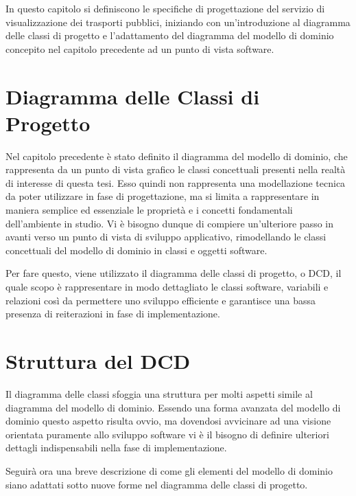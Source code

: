 In questo capitolo si definiscono le specifiche di progettazione del servizio di visualizzazione dei trasporti pubblici, iniziando con un'introduzione al diagramma delle classi di progetto e l'adattamento del diagramma del modello di dominio concepito nel capitolo precedente ad un punto di vista software.



\section{Diagramma delle Classi di Progetto} %
\label{sec:diagramma_delle_classi_di_progetto}

Nel capitolo precedente è stato definito il diagramma del modello di dominio, che rappresenta da un punto di vista grafico le classi concettuali presenti nella realtà di interesse di questa tesi. Esso quindi non rappresenta una modellazione tecnica da poter utilizzare in fase di progettazione, ma si limita a rappresentare in maniera semplice ed essenziale le proprietà e i concetti fondamentali dell'ambiente in studio.
Vi è bisogno dunque di compiere un'ulteriore passo in avanti verso un punto di vista di sviluppo applicativo, rimodellando le classi concettuali del modello di dominio in classi e oggetti software.

Per fare questo, viene utilizzato il diagramma delle classi di progetto, o DCD, il quale scopo è rappresentare in modo dettagliato le classi software, variabili e relazioni così da permettere uno sviluppo efficiente e garantisce una bassa presenza di reiterazioni in fase di implementazione.

\section{Struttura del DCD} %
\label{sec:struttura_del_dcd}

Il diagramma delle classi sfoggia una struttura per molti aspetti simile al diagramma del modello di dominio. Essendo una forma avanzata del modello di dominio questo aspetto risulta ovvio, ma dovendosi avvicinare ad una visione orientata puramente allo sviluppo software vi è il bisogno di definire ulteriori dettagli indispensabili nella fase di implementazione.

Seguirà ora una breve descrizione di come gli elementi del modello di dominio siano adattati sotto nuove forme nel diagramma delle classi di progetto.

